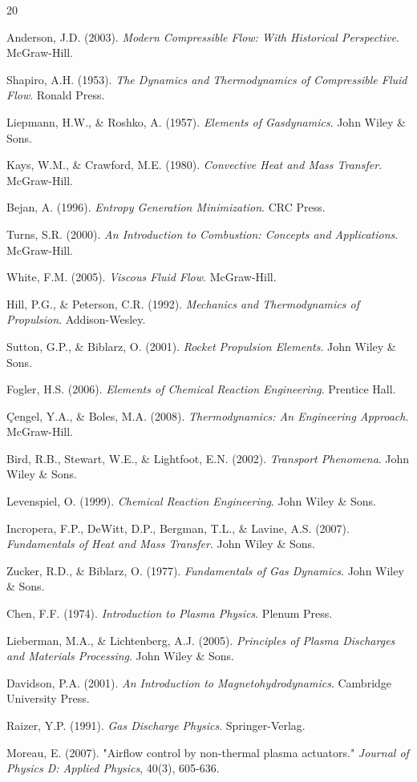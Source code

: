 \documentclass[12pt,a4paper]{article}
\begin{document}
\begin{thebibliography}{20}

Anderson, J.D. (2003). \emph{Modern Compressible Flow: With Historical Perspective}. McGraw-Hill.

Shapiro, A.H. (1953). \emph{The Dynamics and Thermodynamics of Compressible Fluid Flow}. Ronald Press.

Liepmann, H.W., \& Roshko, A. (1957). \emph{Elements of Gasdynamics}. John Wiley \& Sons.

Kays, W.M., \& Crawford, M.E. (1980). \emph{Convective Heat and Mass Transfer}. McGraw-Hill.

Bejan, A. (1996). \emph{Entropy Generation Minimization}. CRC Press.

Turns, S.R. (2000). \emph{An Introduction to Combustion: Concepts and Applications}. McGraw-Hill.

White, F.M. (2005). \emph{Viscous Fluid Flow}. McGraw-Hill.

Hill, P.G., \& Peterson, C.R. (1992). \emph{Mechanics and Thermodynamics of Propulsion}. Addison-Wesley.

Sutton, G.P., \& Biblarz, O. (2001). \emph{Rocket Propulsion Elements}. John Wiley \& Sons.

Fogler, H.S. (2006). \emph{Elements of Chemical Reaction Engineering}. Prentice Hall.

Çengel, Y.A., & Boles, M.A. (2008). \emph{Thermodynamics: An Engineering Approach}. McGraw-Hill.

Bird, R.B., Stewart, W.E., \& Lightfoot, E.N. (2002). \emph{Transport Phenomena}. John Wiley \& Sons.

Levenspiel, O. (1999). \emph{Chemical Reaction Engineering}. John Wiley \& Sons.

Incropera, F.P., DeWitt, D.P., Bergman, T.L., \& Lavine, A.S. (2007). \emph{Fundamentals of Heat and Mass Transfer}. John Wiley \& Sons.

Zucker, R.D., \& Biblarz, O. (1977). \emph{Fundamentals of Gas Dynamics}. John Wiley \& Sons.

Chen, F.F. (1974). \emph{Introduction to Plasma Physics}. Plenum Press.

Lieberman, M.A., \& Lichtenberg, A.J. (2005). \emph{Principles of Plasma Discharges and Materials Processing}. John Wiley \& Sons.

Davidson, P.A. (2001). \emph{An Introduction to Magnetohydrodynamics}. Cambridge University Press.

Raizer, Y.P. (1991). \emph{Gas Discharge Physics}. Springer-Verlag.

Moreau, E. (2007). "Airflow control by non-thermal plasma actuators." \emph{Journal of Physics D: Applied Physics}, 40(3), 605-636.

\end{thebibliography}
\end{document}
